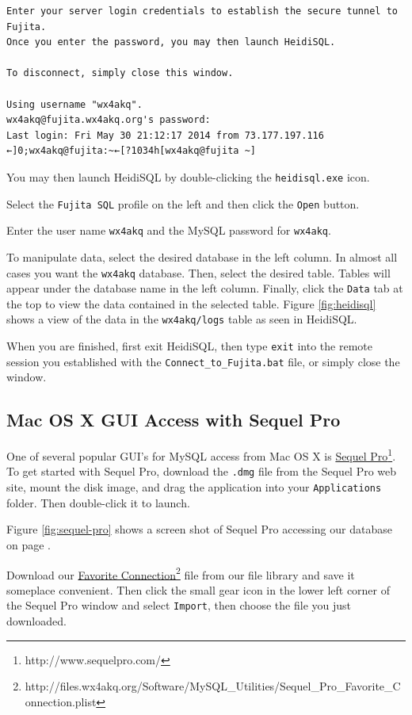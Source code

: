 \documentclass[pdflatex,letterpaper,twoside,12pt]{book}
\begin{document}
\begin{verbatim}
Enter your server login credentials to establish the secure tunnel to Fujita.
Once you enter the password, you may then launch HeidiSQL.

To disconnect, simply close this window.

Using username "wx4akq".
wx4akq@fujita.wx4akq.org's password:
Last login: Fri May 30 21:12:17 2014 from 73.177.197.116
←]0;wx4akq@fujita:~←[?1034h[wx4akq@fujita ~]
\end{verbatim}

You may then launch HeidiSQL by double-clicking the \texttt{heidisql.exe} icon.

Select the \texttt{Fujita SQL} profile on the left and then click the \texttt{Open} button.

Enter the user name \texttt{wx4akq} and the MySQL password for \texttt{wx4akq}.

To manipulate data, select the desired database in the left column.  In almost all cases you want the \texttt{wx4akq} database.  Then, select the desired table.  Tables will appear under the database name in the left column.  Finally, click the \texttt{Data} tab at the top to view the data contained in the selected table.  Figure \ref{fig:heidisql} shows a view of the data in the \texttt{wx4akq/logs} table as seen in HeidiSQL.

When you are finished, first exit HeidiSQL, then type \texttt{exit} into the remote session you established with the \texttt{Connect\_to\_Fujita.bat} file, or simply close the window.

\subsection{Mac OS X GUI Access with Sequel Pro}

One of several popular GUI's for MySQL access from Mac OS X is \href{http://www.sequelpro.com/}{Sequel Pro}\footnote{http://www.sequelpro.com/}.  To get started with Sequel Pro, download the \texttt{.dmg} file from the Sequel Pro web site, mount the disk image, and drag the application into your \texttt{Applications} folder.  Then double-click it to launch.

Figure \ref{fig:sequel-pro} shows a screen shot of Sequel Pro accessing our database on page \pageref{fig:sequel-pro}.

Download our \href{http://files.wx4akq.org/Software/MySQL\_Utilities/Sequel\_Pro\_Favorite\_Connection.plist}{Favorite Connection}\footnote{http://files.wx4akq.org/Software/MySQL\_Utilities/Sequel\_Pro\_Favorite\_Connection.plist} file from our file library and save it someplace convenient.  Then click the small gear icon in the lower left corner of the Sequel Pro window and select \texttt{Import}, then choose the file you just downloaded.
\end{document}
